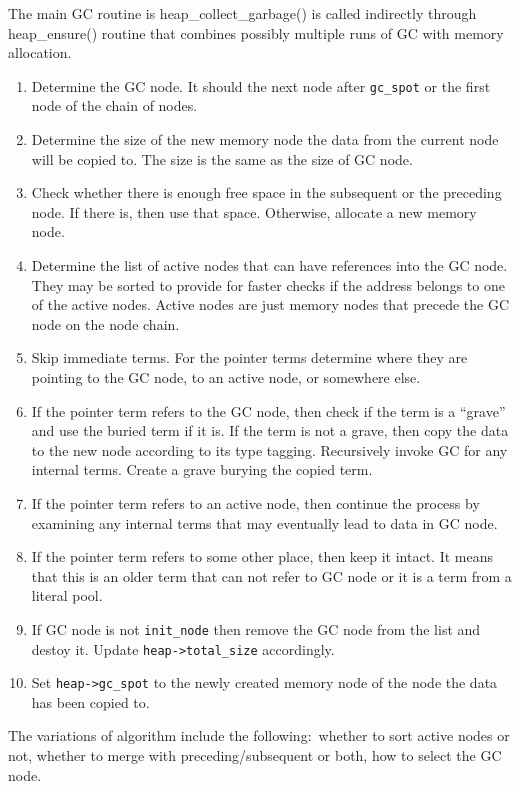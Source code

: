 \documentclass{article}
\begin{document}
The main GC routine is heap\_collect\_garbage() is called indirectly through
heap\_ensure() routine that combines possibly multiple runs of GC with memory
allocation.

\begin{enumerate}
\item Determine the GC node. It should the next node after \verb$gc_spot$ or the
first node of the chain of nodes.
\item Determine the size of the new memory node the data from the current node
will be copied to. The size is the same as the size of GC node.
\item Check whether there is enough free space in the subsequent or the
preceding node. If there is, then use that space. Otherwise, allocate a new
memory node.
\item Determine the list of active nodes that can have references into the GC
node. They may be sorted to provide for faster checks if the address belongs to
one of the active nodes. Active nodes are just memory nodes that precede the GC
node on the node chain.
\item Skip immediate terms. For the pointer terms determine where they are
pointing to the GC node, to an active node, or somewhere else.
\item If the pointer term refers to the GC node, then check if the term is a
``grave'' and use the buried term if it is. If the term is not a grave,
then copy the data to the new node according to its type tagging. Recursively
invoke GC for any internal terms. Create a grave burying the copied term.
\item If the pointer term refers to an active node, then continue the process by
examining any internal terms that may eventually lead to data in GC node.
\item If the pointer term refers to some other place, then keep it intact. It
means that this is an older term that can not refer to GC node or it is a term
from a literal pool.
\item If GC node is not \verb$init_node$ then remove the GC node from the list
and destoy it. Update \verb$heap->total_size$ accordingly.
\item Set \verb$heap->gc_spot$ to the newly created memory node of the node the
data has been copied to.
\end{enumerate}

The variations of algorithm include the following$:$ whether to sort active nodes
or not, whether to merge with preceding/subsequent or both, how to select the GC
node.
\end{document}

